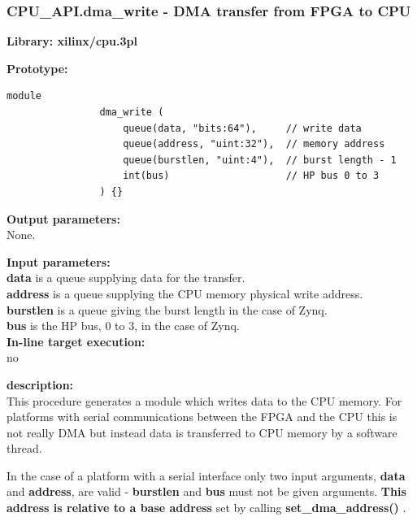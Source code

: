         \subsubsection{CPU\_API.dma\_write - DMA transfer from FPGA to CPU}\label{sec:lpcpudmaw}

            {\bf Library: xilinx/cpu.3pl}

            {\bf Prototype:} \\
            \vsp
            \begin{lstlisting}[gobble=12, language=threepl]
                module
                dma_write (
                    queue(data, "bits:64"),     // write data
                    queue(address, "uint:32"),  // memory address
                    queue(burstlen, "uint:4"),  // burst length - 1
                    int(bus)                    // HP bus 0 to 3
                ) {}
            \end{lstlisting}

            {\bf Output parameters:} \\
            
            None.

            {\bf Input parameters:} \\
            {\bf data} is a queue supplying data for the transfer.\\
            {\bf address} is a queue supplying the CPU memory physical write address.\\
            {\bf burstlen} is a queue giving the burst length in the case of Zynq.\\
            {\bf bus} is the HP bus, 0 to 3, in the case of Zynq.\\
        
            {\bf In-line target execution:} \\
            no

            {\bf description:} \\
            This procedure generates a module which writes data to the CPU
            memory. For platforms with serial communications between the
            FPGA and the CPU this is not really DMA but instead data is transferred
            to CPU memory by a software thread.
            
            In the case of a platform with a serial interface only two input
            arguments, {\bf data} and {\bf address}, are valid - {\bf burstlen}
            and {\bf bus} must not be given arguments. {\bf This address is
            relative to a base address} set by calling {\bf set\_dma\_address()}
            .
            
